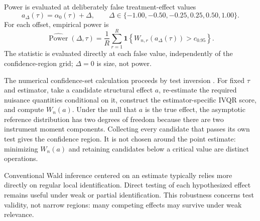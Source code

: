 Power is evaluated at deliberately false treatment-effect values
\begin{equation}
  a_{\Delta}(\tau)=\alpha_0(\tau)+\Delta,
  \qquad
  \Delta\in\{-1.00,-0.50,-0.25,0.25,0.50,1.00\}.
  \label{eq:performance-alternatives}
\end{equation}
For each offset, empirical power is
\begin{equation}
  \widehat{\operatorname{Power}}(\Delta,\tau)
    =\frac{1}{R}\sum_{r=1}^{R}
      \mathbf{1}\!\left\{W_{n,r}\!\left(a_{\Delta}(\tau)\right)>c_{0.95}\right\}.
  \label{eq:performance-power}
\end{equation}
The statistic is evaluated directly at each false value, independently of the confidence-region grid; $\Delta=0$ is size, not power.

The numerical confidence-set calculation proceeds by test inversion \parencite{chernozhukov_hansen_2008}. For fixed $\tau$ and estimator, take a candidate structural effect $a$, re-estimate the required nuisance quantities conditional on it, construct the estimator-specific IVQR score, and compute $W_n(a)$. Under the null that $a$ is the true effect, the asymptotic reference distribution has two degrees of freedom because there are two instrument moment components. Collecting every candidate that passes its own test gives the confidence region. It is not chosen around the point estimate: minimizing $W_n(a)$ and retaining candidates below a critical value are distinct operations.

Conventional Wald inference centered on an estimate typically relies more directly on regular local identification. Direct testing of each hypothesized effect remains useful under weak or partial identification. This robustness concerns test validity, not narrow regions: many competing effects may survive under weak relevance.

